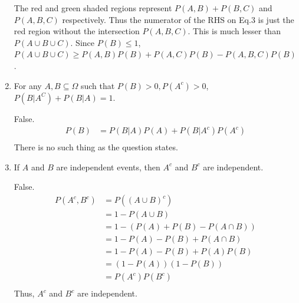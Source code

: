 \documentclass[a4paper]{article}
\theoremstyle{definition}
\newenvironment{soln}{
	\leavevmode\color{blue}\ignorespaces
}{}
\begin{document}
\begin{enumerate}
\begin{soln}

			The red and green shaded regions represent $P(A,B) + P(B,C)$ and $P(A,B,C)$ respectively. Thus the numerator of the RHS on Eq.3 is just the red region without the intersection $P(A,B,C)$. This is much lesser than $P(A \cup B \cup C)$. Since $P(B) \le 1$, $P(A \cup B \cup C) \ge P(A,B)P(B) + P(A,C)P(B) - P(A,B,C)P(B)$.
		\end{soln}
		
		\item For any $A, B\subseteq\Omega$ such that $P(B) > 0, P(A^c) > 0$,
		$P(B|A^C) + P(B|A) = 1$.\\ 
		\begin{soln}  
			False.
			\begin{align*}
				P(B) &= P(B|A)P(A) + P(B|A^c)P(A^c) \\
			\end{align*}
			There is no such thing as the question states.\\
		\end{soln}
		
		\item If $A$ and $B$ are independent events, then $A^{c}$ and $B^{c}$ are independent.\\
		\begin{soln}
			False. 
			\begin{align*}
				P(A^c,B^c) &= P((A \cup B)^c) \\
				&= 1 - P(A \cup B) \\
				&= 1 - (P(A) + P(B) - P(A \cap B)) \\
				&= 1 - P(A) - P(B) + P(A \cap B) \\
				&= 1 - P(A) - P(B) + P(A)P(B) \\
				&= (1 - P(A))(1 - P(B)) \\
				&= P(A^c)P(B^c) \\
			\end{align*}
			Thus, $A^c$ and $B^c$ are independent.\\
		\end{soln}
		
	\end{enumerate}
	
\end{document}
